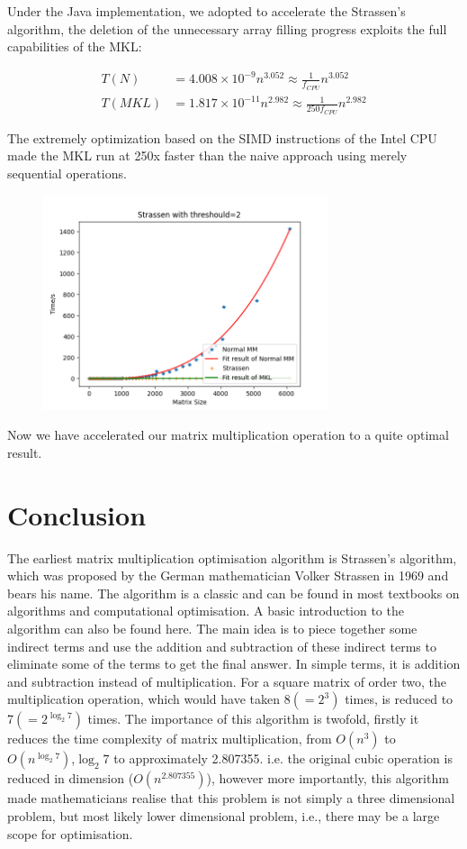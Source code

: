 \documentclass[UTF8]{ctexart}
\begin{document}
Under the Java implementation, we adopted to accelerate the Strassen's
algorithm, the deletion of the unnecessary array filling progress
exploits the full capabilities of the MKL:

\begin{equation}
  \begin{aligned}
    T(N)   & =4.008\times 10^{-9}n^{3.052}\approx \frac{1}{f_{CPU}}n^{3.052}    \\
    T(MKL) & =1.817\times10^{-11}n^{2.982}\approx \frac{1}{250f_{CPU}}n^{2.982}
  \end{aligned}
\end{equation}

The extremely optimization based on the SIMD instructions of the Intel
CPU made the MKL run at 250x faster than the naive approach using merely
sequential operations.

\begin{figure}[htb]
  \centering
  \includegraphics[height=6.3cm]{../ppt/slide-UIBK/mkl.png}
  \caption{}
\end{figure}
Now we have accelerated our matrix multiplication operation to a quite
optimal result.

\section{Conclusion}
\label{sec::Conc}

The earliest matrix multiplication optimisation algorithm is Strassen's algorithm\cite{strassen1969gaussian}, which was proposed by the German mathematician Volker Strassen in 1969 and bears his name. The algorithm is a classic and can be found in most textbooks on algorithms and computational optimisation. A basic introduction to the algorithm can also be found here. The main idea is to piece together some indirect terms and use the addition and subtraction of these indirect terms to eliminate some of the terms to get the final answer. In simple terms, it is addition and subtraction instead of multiplication. For a square matrix of order two, the multiplication operation, which would have taken 8\((=2^{3})\) times, is reduced to 7\((=2^{\log_{2} 7})\) times. The importance of this algorithm is twofold, firstly it reduces the time complexity of matrix multiplication, from \(O(n^3)\) to \(O(n^{\log_{2} 7})\),\(\log_{2} 7\) to approximately 2.807355. i.e. the original cubic operation is reduced in dimension (\(O(n^{2.807355})\)), however more importantly, this algorithm made mathematicians realise that this problem is not simply a three dimensional problem, but most likely lower dimensional problem, i.e., there may be a large scope for optimisation.
\end{document}
